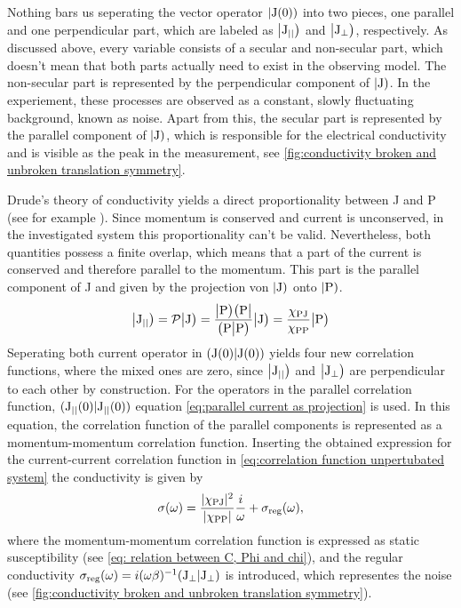 Nothing bars us seperating the vector operator $|\mathrm{\mathrm{J}(0)})$ into two pieces, one parallel and one perpendicular part, which are labeled as $\big|{\mathrm{J}_{\mid\mid}}\big)$ and $\big|{\mathrm{J}_{\bot}}\big)$, respectively.  %
As discussed above, every variable consists of a secular and non-secular part, which doesn't mean that both parts actually need to exist in the observing model.
The non-secular part is represented by the perpendicular component of $|\mathrm{J})$.
In the experiement, these processes are observed as a constant, slowly fluctuating background, known as noise.
Apart from this,  %
the secular part is represented by the parallel component of $|\mathrm{J})$, which is responsible for the electrical conductivity and is visible as the peak in the measurement, see \ref{fig:conductivity broken and unbroken translation symmetry}.

Drude's theory of conductivity yields a direct proportionality between J and P (see for example \cite{Gross&Marx}).
Since momentum is conserved and current is unconserved, in the investigated system this proportionality can't be valid.
Nevertheless, both quantities possess a finite overlap, which means that a part of the current is conserved and therefore parallel to the momentum.
This part is the parallel component of J and given by the projection von $|\mathrm{\mathrm{J}})$ onto $|\mathrm{\mathrm{P}})$.
%
\begin{align}
	\big|{\mathrm{J}_{\mid\mid}}\big) = \mathcal{P}\big|{\mathrm{J}}\big) = \frac{\big|{\mathrm{P}}\big)\big({\mathrm{P}}\big|}{\big({\mathrm{P}}\big|{\mathrm{P}}\big)} \big|{\mathrm{J}}\big) = \frac{\chi_{\mathrm{PJ}}}{\chi_{\mathrm{PP}}} \big|{\mathrm{P}}\big)
	\label{eq:parallel current as projection}
\end{align}
%
Seperating both current operator in $({\mathrm{J}(0)}|{\mathrm{J}(0)})$ yields four new correlation functions, where the mixed ones are zero, since $\big|{\mathrm{J}_{\mid\mid}}\big)$ and $\big|{\mathrm{J}_{\bot}}\big)$ are perpendicular to each other by construction.
For the operators in the parallel correlation function, $({\mathrm{J}_{\mid\mid}(0)}|{\mathrm{J}_{\mid\mid}(0)})$ equation \eqref{eq:parallel current as projection} is used.
In this equation, the correlation function of the parallel components is represented as a momentum-momentum correlation function.
Inserting the obtained expression for the current-current correlation function in \eqref{eq:correlation function unpertubated system} the conductivity is given by 
%
\begin{align}
	\sigma (\omega) = \frac{\vert\chi_{\mathrm{PJ}}\vert^{2}}{\vert\chi_{\mathrm{PP}}\vert} \frac{i}{\omega}  + \sigma_{\mathrm{reg}}(\omega),
\end{align}
%
where the momentum-momentum correlation function is expressed as static susceptibility (see \eqref{eq: relation between C, Phi and chi}), and the regular conductivity $\sigma_{\mathrm{reg}}(\omega) = i(\omega \beta)^{-1} ({\mathrm{J}_{\bot}}|{\mathrm{J}_{\bot}})$ is introduced, which representes the noise (see \ref{fig:conductivity broken and unbroken translation symmetry}).

